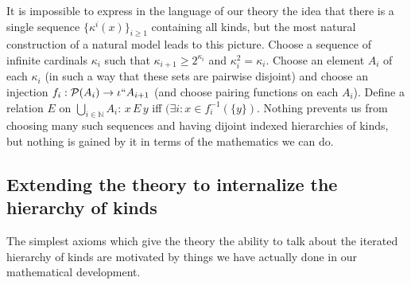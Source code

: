\documentclass[12pt]{article}
\begin{document}
It is impossible to express in the language of our theory the idea that there is a single sequence $\{\kappa^i(x)\}_{i \geq 1}$ containing all kinds, but the most natural construction of a natural model leads to this picture.  Choose a sequence of infinite cardinals $\kappa_i$ such that $\kappa_{i+1} \geq 2^{\kappa_i}$ and $\kappa_i^2=\kappa_i$.  Choose an element $A_i$ of each $\kappa_i$ (in such a way that these sets are pairwise disjoint) and choose an injection $f_i:{\cal P}(A_i) \rightarrow \iota``A_{i+1}$ (and choose pairing functions on each $A_i$).  Define a relation $E$ on $\bigcup_{i \in \mathbb N}A_i$:  $x \,E\,y$ iff $(\exists i:x \in f_{i}^{-1}(\{y\})$.   Nothing prevents us from choosing many such sequences and having dijoint indexed hierarchies of kinds, but nothing is gained by it in terms of the mathematics we can do.

\subsection{Extending the theory to internalize the hierarchy of kinds}

The simplest axioms which give the theory the ability to talk about the iterated hierarchy of kinds are motivated by things we have actually done in our mathematical development.
\end{document}
